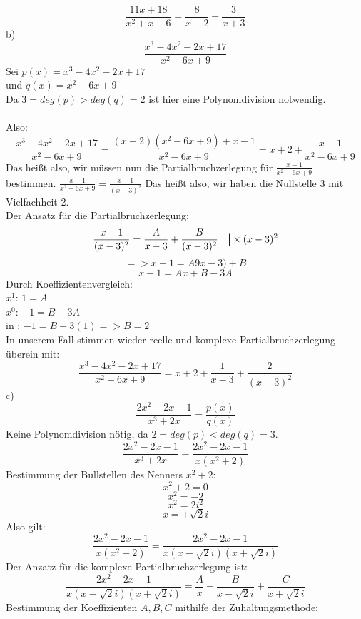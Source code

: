 \documentclass[11pt]{article}
\newcommand\mybar{\kern1pt\rule[-\dp\strutbox]{.8pt}{\baselineskip}\kern1pt}
\newcommand*\circled[1]{\tikz[baseline=(char.base)]{
            \node[shape=circle,draw,inner sep=2pt] (char) {#1};}}
\begin{document}
				$$\frac{11x+18}{x^2+x-6}=\frac{8}{x-2}+\frac{3}{x+3}$$
			\indent b)\\
				$$\frac{x^3-4x^2-2x+17}{x^2-6x+9}$$
				Sei $p(x)=x^3-4x^2-2x+17$\\
				und $q(x)=x^2-6x+9$\\
				Da $3=deg(p)>deg(q)=2$ ist hier eine Polynomdivision notwendig.\\
				\\
				Also:\\
				$$\frac{x^3-4x^2-2x+17}{x^2-6x+9}=\frac{(x+2)(x^2-6x+9)+x-1}{x^2-6x+9}=x+2+\frac{x-1}{x^2-6x+9}$$
				Das heißt also, wir müssen nun die Partialbruchzerlegung für $\frac{x-1}{x^2-6x+9}$ bestimmen.
				$\frac{x-1}{x^2-6x+9}=\frac{x-1}{(x-3)^2}$ \hspace{10pt} Das heißt also, wir haben die Nullstelle 3 mit Vielfachheit 2.\\
				Der Ansatz für die Partialbruchzerlegung:\\
				$$\frac{x-1}{(x-3)^2}=\frac{A}{x-3}+\frac{B}{(x-3)^2} \hspace{10pt} \mybar \times (x-3)^2$$
				$$=>x-1=A9x-3)+B$$
				$$x-1=Ax+B-3A$$
				Durch Koeffizientenvergleich:\\
				\indent $x^1$: $1=A$ \circled{1}\\
				\indent $x^0$: $-1=B-3A$ \circled{2}\\
				\circled{1} in \circled{2}: $-1=B-3(1) => B=2$\\
				In unserem Fall stimmen wieder reelle und komplexe Partialbruchzerlegung überein mit:\\
				$$\frac{x^3-4x^2-2x+17}{x^2-6x+9}=x+2+\frac{1}{x-3}+\frac{2}{(x-3)^2}$$
			\indent c)\\
				$$\frac{2x^2-2x-1}{x^3+2x}=\frac{p(x)}{q(x)}$$
				Keine Polynomdivision nötig, da $2=deg(p)<deg(q)=3$.\\
				$$\frac{2x^2-2x-1}{x^3+2x}=\frac{2x^2-2x-1}{x(x^2+2)}$$
				Bestimmung der Bullstellen des Nenners $x^2+2$:\\
				$$x^2+2=0$$
				$$x^2=-2$$
				$$x^2=2i^2$$
				$$x=\pm \sqrt{2}i$$
				Also gilt:\\
				$$\frac{2x^2-2x-1}{x(x^2+2)}=\frac{2x^2-2x-1}{x(x-\sqrt{2}i)(x+\sqrt{2}i)}$$
				Der Anzatz für die komplexe Partialbruchzerlegung ist:\\
				$$\frac{2x^2-2x-1}{x(x-\sqrt{2}i)(x+\sqrt{2}i)}=\frac{A}{x}+\frac{B}{x-\sqrt{2}i}+\frac{C}{x+\sqrt{2}i}$$
				Bestimmung der Koeffizienten $A,B,C$ mithilfe der Zuhaltungsmethode:\\
\end{document}
